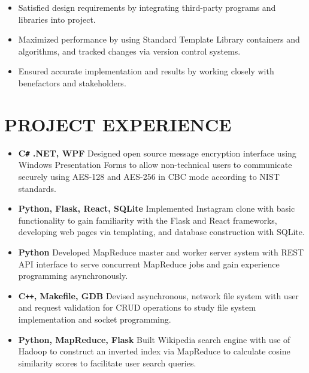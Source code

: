 \documentclass[overlapped]{res}
\begin{document}
\begin{resume}
\begin{itemize}
    \item Satisfied design requirements by integrating third-party programs 
    and libraries into project.
    
    \item Maximized performance by using 
    Standard Template Library containers and algorithms,
    and tracked changes via version control systems.

    \item Ensured accurate implementation and results by working closely
     with benefactors and stakeholders.
\end{itemize}

\section{PROJECT EXPERIENCE}

\begin{itemize}  \itemsep -2pt %
    \item \textbf{C\texttt{\#} .NET, WPF}
    Designed open source message encryption interface using
    Windows Presentation Forms to allow non-technical users
    to communicate securely using AES-128 and AES-256 in CBC mode
    according to NIST standards.
    \item \textbf{Python, Flask, React, SQLite}
    Implemented Instagram clone with basic functionality 
    to gain familiarity with the Flask and React frameworks, 
    developing web pages via templating, 
    and database construction with SQLite.
    \item \textbf{Python}
    Developed MapReduce master and worker server system 
    with REST API interface to serve concurrent MapReduce jobs
    and gain experience programming asynchronously.
    \item \textbf{C\texttt{++}, Makefile, GDB} Devised asynchronous, network file system with user and request
    validation for CRUD operations to study file system implementation
    and socket programming.
    \item \textbf{Python, MapReduce, Flask}
    Built Wikipedia search engine with use of Hadoop 
    to construct an inverted index via MapReduce
    to calculate cosine similarity scores 
    to facilitate user search queries.


\end{itemize}
\end{resume}
\end{document}
